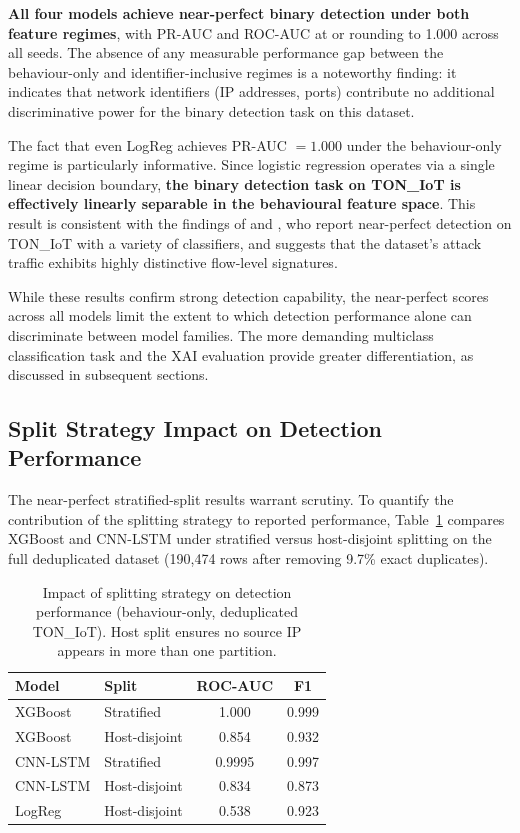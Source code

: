\documentclass[12pt,a4paper]{report}
\begin{document}
\textbf{All four models achieve near-perfect binary detection under both feature regimes}, with PR-AUC and ROC-AUC at or rounding to 1.000 across all seeds. The absence of any measurable performance gap between the behaviour-only and identifier-inclusive regimes is a noteworthy finding: it indicates that network identifiers (IP addresses, ports) contribute no additional discriminative power for the binary detection task on this dataset.

The fact that even LogReg achieves PR-AUC $= 1.000$ under the behaviour-only regime is particularly informative. Since logistic regression operates via a single linear decision boundary, \textbf{the binary detection task on TON\_IoT is effectively linearly separable in the behavioural feature space}. This result is consistent with the findings of \citet{alsaedi2020} and \citet{moustafa2021}, who report near-perfect detection on TON\_IoT with a variety of classifiers, and suggests that the dataset's attack traffic exhibits highly distinctive flow-level signatures.

While these results confirm strong detection capability, the near-perfect scores across all models limit the extent to which detection performance alone can discriminate between model families. The more demanding multiclass classification task and the XAI evaluation provide greater differentiation, as discussed in subsequent sections.

\subsection{Split Strategy Impact on Detection Performance}
\label{sec:split-impact}

The near-perfect stratified-split results warrant scrutiny. To quantify the contribution of the splitting strategy to reported performance, Table~\ref{tab:split-impact} compares XGBoost and CNN-LSTM under stratified versus host-disjoint splitting on the full deduplicated dataset (190,474 rows after removing 9.7\% exact duplicates).

\begin{table}[H]
\centering
\caption{Impact of splitting strategy on detection performance (behaviour-only, deduplicated TON\_IoT). Host split ensures no source IP appears in more than one partition.}
\label{tab:split-impact}
\begin{tabular}{llcc}
\toprule
\textbf{Model} & \textbf{Split} & \textbf{ROC-AUC} & \textbf{F1} \\
\midrule
XGBoost & Stratified & 1.000 & 0.999 \\
XGBoost & Host-disjoint & 0.854 & 0.932 \\
CNN-LSTM & Stratified & 0.9995 & 0.997 \\
CNN-LSTM & Host-disjoint & 0.834 & 0.873 \\
LogReg & Host-disjoint & 0.538 & 0.923 \\
\bottomrule
\end{tabular}
\end{table}
\end{document}
